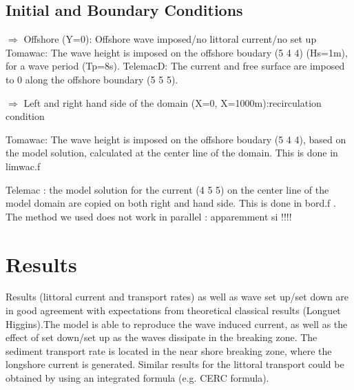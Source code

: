 %
%
\subsection{Initial and Boundary Conditions}
%
$\Rightarrow $ Offshore (Y=0): Offshore wave imposed/no littoral current/no set up 
Tomawac:
The wave height is imposed on the offshore boudary (5 4 4) (Hs=1m), for a wave period (Tp=8s).
TelemacD:
The current and free surface are imposed to 0 along the offshore boundary (5 5 5).

$\Rightarrow $ Left and right hand side of the domain (X=0, X=1000m):recirculation condition 

Tomawac:
The wave height is imposed on the offshore boudary (5 4 4), based on the model solution, calculated  at the center line of the domain.  This is done in limwac.f 

Telemac :
the model solution for the current (4 5 5) on the center line of the model domain are copied on both right and hand side. This is done in bord.f . The method we used does not work in parallel : apparemment si !!!!

%
%
%
%

%
%
\section{Results}
%
Results (littoral current and transport rates) as well as wave set up/set down are in good agreement with
expectations from theoretical classical results (Longuet Higgins).The model is able to reproduce the wave
induced current, as well as the effect of set down/set up as the waves dissipate in the breaking zone.
The sediment transport rate is located in the near shore breaking zone, where the longshore current is
generated.
Similar results for the littoral transport could be obtained by using an integrated formula (e.g. CERC formula).

